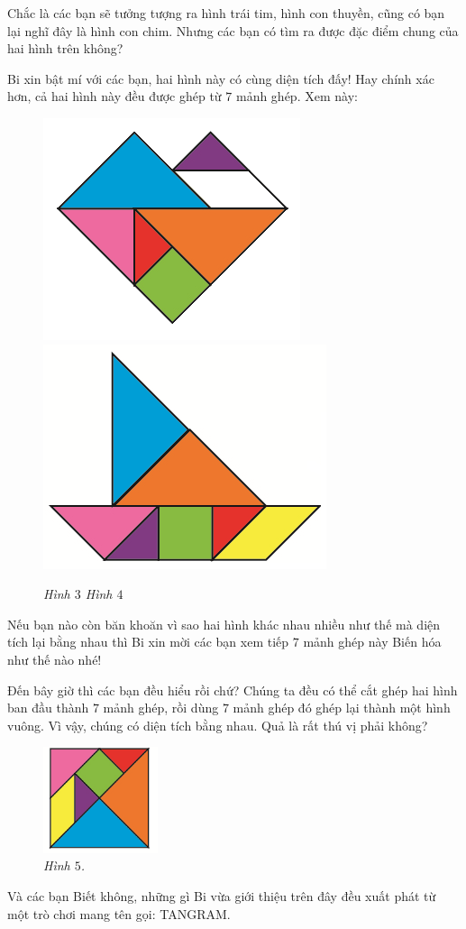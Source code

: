 	\vskip 0.1cm
	Chắc là các bạn sẽ tưởng tượng ra hình trái tim, hình con thuyền, cũng có bạn lại nghĩ đây là hình con chim. Nhưng các bạn có tìm ra được đặc điểm chung của hai hình trên không?
	\begin{multicols}{2}
		Bi xin bật mí với các bạn, hai hình này có cùng diện tích đấy! Hay chính xác hơn, cả hai hình này đều được ghép từ $7$ mảnh ghép. Xem này:
		\begin{figure}[H]
			\vspace*{5pt}
			\centering
			\captionsetup{labelformat=empty}
			\includegraphics[width=.4\linewidth]{imame3}\includegraphics[width=.4\linewidth]{image4}
			\caption{\small \it Hình $3$\hspace*{30pt} Hình $4$}
			\vspace*{-10pt}
		\end{figure}
	\end{multicols}
	Nếu bạn nào còn băn khoăn vì sao hai hình khác nhau nhiều như thế mà diện tích lại bằng nhau thì Bi xin mời các bạn xem tiếp $7$ mảnh ghép này Biến hóa như thế nào nhé!
	\begin{multicols}{2}
		Đến bây giờ thì các bạn đều hiểu rồi chứ? Chúng ta đều có thể cắt ghép hai hình ban đầu thành $7$ mảnh ghép, rồi dùng $7$ mảnh ghép đó ghép lại thành một hình vuông. Vì vậy, chúng có diện tích bằng nhau. Quả là rất thú vị phải không?
		\begin{figure}[H]
			\vspace*{5pt}	
			\captionsetup{labelformat=empty}
			\centering
			\captionsetup{justification=raggedleft}
			\includegraphics[width =0.3\textwidth]{image5}
			\caption{\small\it Hình $5$.}
			\vspace*{-10pt}
		\end{figure}
	\end{multicols}
	Và các bạn Biết không, những gì Bi vừa giới thiệu trên đây đều xuất phát từ một trò chơi mang tên gọi: TANGRAM.
	
